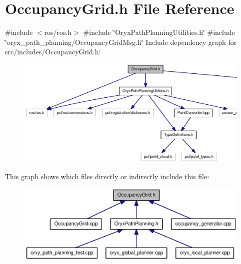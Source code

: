 \section{\-Occupancy\-Grid.\-h \-File \-Reference}
\label{src_2includes_2OccupancyGrid_8h}
{\ttfamily \#include $<$ros/ros.\-h$>$}\*
{\ttfamily \#include \char`\"{}\-Oryx\-Path\-Planning\-Utilities.\-h\char`\"{}}\*
{\ttfamily \#include \char`\"{}oryx\-\_\-path\-\_\-planning/\-Occupancy\-Grid\-Msg.\-h\char`\"{}}\*
\-Include dependency graph for src/includes/\-Occupancy\-Grid.h\-:
\nopagebreak
\begin{figure}[H]
\begin{center}
\leavevmode
\includegraphics[width=350pt]{src_2includes_2OccupancyGrid_8h__incl}
\end{center}
\end{figure}
\-This graph shows which files directly or indirectly include this file\-:
\nopagebreak
\begin{figure}[H]
\begin{center}
\leavevmode
\includegraphics[width=350pt]{src_2includes_2OccupancyGrid_8h__dep__incl}
\end{center}
\end{figure}
